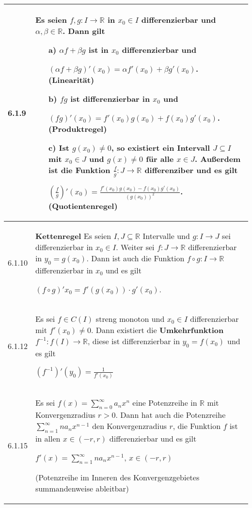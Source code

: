     \begin{longtable}{p{1cm} p{16cm}}
        \toprule

        6.1.9 & Es seien $f,g: I \rightarrow \mathbb{R}$ in $x_0 \in I$ differenzierbar und $\alpha,\beta \in \mathbb{R}$. Dann gilt
                \begin{itemize}[topsep=-0.5cm]
                    \item[a)] $\alpha f +\beta g$ ist in $x_0$ differenzierbar und \hfill \break
                                \centerline{$(\alpha f + \beta g)'(x_0) = \alpha f'(x_0) + \beta g'(x_0)$. \textbf{(Linearität)}}
                    \item[b)] $fg$ ist differenzierbar in $x_0$ und \hfill \break
                                \centerline{$ (fg)'(x_0)=f'(x_0)g(x_0) + f(x_0)g'(x_0)$. (\textbf{Produktregel})}
                    \item[c)] Ist $g(x_0) \neq 0$, so existiert ein Intervall $J \subseteq I$ mit $x_0 \in J$ und $g(x) \neq 0$ für
                                alle $x \in J$. Außerdem ist die Funktion $\frac{f}{g}: J \rightarrow \mathbb{R}$ 
                                differenziber und es gilt \hfill \break
                                \centerline{$(\frac{f}{g})'(x_0)= \frac{f'(x_0)g(x_0)-f(x_0)g'(x_0)}{(g(x_0))^2}$. (\textbf{Quotientenregel})} 
                \end{itemize} \vspace{-0cm} \\
        \midrule
        6.1.10& \textbf{Kettenregel} \hfill \break
                Es seien $I, J \subseteq \mathbb{R}$ Intervalle und $g: I \rightarrow J$ sei differenzierbar in $x_0 \in I$.
                Weiter sei $f:J \rightarrow \mathbb{R}$ differenzierbar in $y_0 = g(x_0)$. Dann ist auch die Funktion
                $f \circ g: I \rightarrow \mathbb{R}$ differenzierbar in $x_0$ und es gilt \hfill \break
                \centerline{$(f\circ g)'x_0 = f'(g(x_0)) \cdot g'(x_0)$.} \\
        \midrule
        6.1.12& Es sei $f \in C(I)$ streng monoton und $x_0 \in I$ differenzierbar mit \textbf{$f'(x_0) \neq 0$}. Dann existiert die
                \textbf{Umkehrfunktion} $f^{-1}: f(I) \rightarrow \mathbb{R}$, diese ist differenzierbar in $y_0 = f(x_0)$ und es gilt \hfill \break
                \centerline{$(f^{-1})'(y_0) = \frac{1}{f'(x_0)} $} \\
        \midrule
        6.1.15& Es sei $f(x) = \sum^{\infty}_{n=0} a_n  x^n$ eine Potenzreihe in $\mathbb{R}$ mit Konvergenzradius $r >0$. Dann hat
                auch die Potenzreihe $\sum^{\infty}_{n=1} na_nx^{n-1}$ den Konvergenzradius $r$, die Funktion $f$ ist in allen
                $x \in (-r,r)$ differenzierbar und es gilt \hfill \break
                \centerline{$f'(x) = \sum^{\infty}_{n=1} na_n x^{n-1}$, $x \in (-r,r)$}
                (Potenzreihe im Inneren des Konvergenzgebietes summandenweise ableitbar)\\

        \bottomrule
    \end{longtable}
    

